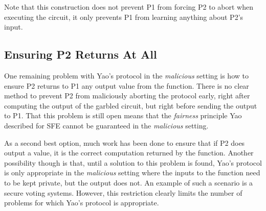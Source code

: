 Note that this construction does not prevent \ac{P1} from forcing \ac{P2} to abort when executing the circuit, it only prevents \ac{P1} from learning anything about \ac{P2}'s input.


\subsection{Ensuring \ac{P2} Returns At All}

One remaining problem with Yao's protocol in the \emph{malicious} setting is how to ensure \ac{P2} returns to \ac{P1} any output value from the function.  There is no clear method to prevent \ac{P2} from maliciously aborting the protocol early, right after computing the output of the garbled circuit, but right before sending the output to \ac{P1}.  That this problem is still open means that the \emph{fairness} principle Yao described for \ac{SFE} cannot be guaranteed in the \emph{malicious} setting.

As a second best option, much work has been done to ensure that if \ac{P2} does output a value, it is the correct computation returned by the function\cite{shen2011two}.  Another possibility though is that, until a solution to this problem is found, Yao's protocol is only appropriate in the \emph{malicious} setting where the inputs to the function need to be kept private, but the output does not.  An example of such a scenario is a secure voting systems.  However, this restriction clearly limits the number of problems for which Yao's protocol is appropriate.

